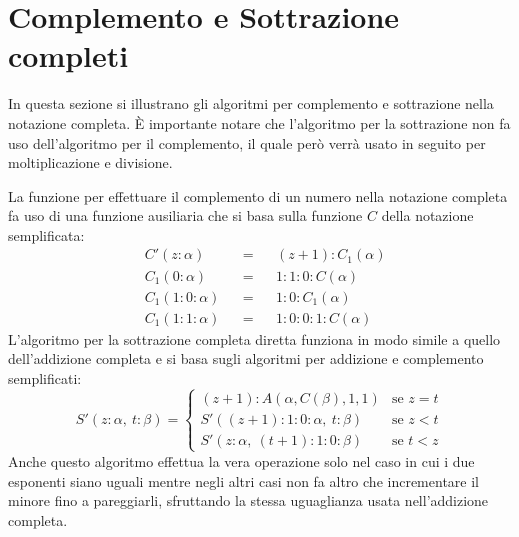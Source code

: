 \documentclass[Lau]{sapthesis}
\begin{document}
\section{Complemento e Sottrazione completi}
In questa sezione si illustrano gli algoritmi per complemento e sottrazione nella notazione completa. È importante notare che l'algoritmo per la sottrazione non fa uso dell'algoritmo per il complemento, il quale però verrà usato in seguito per moltiplicazione e divisione.

La funzione per effettuare il complemento di un numero nella notazione completa fa uso di una funzione ausiliaria che si basa sulla funzione $C$ della notazione semplificata:
\begin{align*}
&C'(z:\alpha) && = && (z+1):C_1(\alpha)\\
&C_1(0:\alpha) && = && 1:1:0:C(\alpha)\\
&C_1(1:0:\alpha) && = && 1:0:C_1(\alpha)\\
&C_1(1:1:\alpha) && = && 1:0:0:1:C(\alpha)
\end{align*}
L'algoritmo per la sottrazione completa diretta funziona in modo simile a quello dell'addizione completa e si basa sugli algoritmi per addizione e complemento semplificati:
\begin{equation*}
S'(z:\alpha, \ t:\beta) = \begin{cases}
(z+1):A(\alpha, C(\beta), 1, 1) & \text{se $z=t$}\\
S'((z+1):1:0:\alpha, \ t:\beta) & \text{se $z<t$}\\
S'(z:\alpha, \ (t+1):1:0:\beta) & \text{se $t<z$}
\end{cases}
\end{equation*}
Anche questo algoritmo effettua la vera operazione solo nel caso in cui i due esponenti siano uguali mentre negli altri casi non fa altro che incrementare il minore fino a pareggiarli, sfruttando la stessa uguaglianza usata nell'addizione completa.
\end{document}
